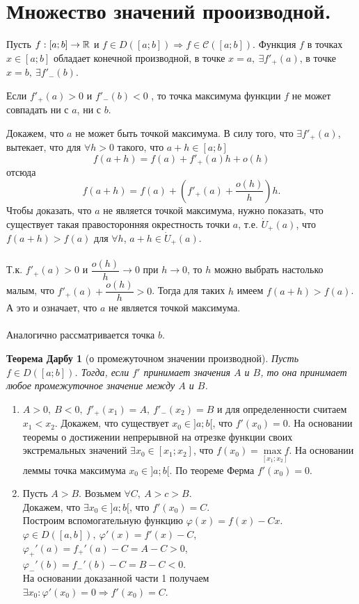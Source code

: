 \section{Множество значений прооизводной.}
Пусть $f:[a;b] \rightarrow \mathbb{R}$ и $f \in D([a;b]) \Rightarrow f \in \mathcal{C} ([a;b]) $. Функция $f$ в точках $x \in [a;b]$ обладает конечной производной, в точке $x=a, \ \exists f'_+ (a)$, в точке $x=b, \ \exists f'_- (b)$.
\begin{lemma}
	Если $f'_+ (a)>0$ и $f'_- (b)<0$ , то точка максимума функции $f$ не может совпадать ни с $a$, ни с $b$.
\end{lemma}
\begin{Proof}
	Докажем, что $a$ не может быть точкой максимума. В силу того, что $\exists f'_+ (a)$, вытекает, что для $\forall h>0$ такого, что $a+h \in [a;b]$
	$$f(a+h)=f(a)+f'_+ (a)h+o(h)$$
	отсюда $$f(a+h)=f(a)+(f'_+ (a)+\frac{o(h)}{h})h.$$
	Чтобы доказать, что $a$ не является точкой максимума, нужно показать, что существует такая правосторонняя окрестность точки $a$, т.е. $\dot U_+(a)$, что $f(a+h)>f(a)$ для $\forall h$, $a+h \in \dot U_+(a)$.\\\\
	Т.к. $f'_+ (a)>0$ и $\dfrac{o(h)}{h} \rightarrow 0$ при $h \rightarrow 0$, то $h$ можно выбрать настолько малым, что $f'_+ (a)+\dfrac{o(h)}{h} >0$. Тогда для таких $h$ имеем $f(a+h)>f(a)$. А это и означает, что $a$ не является точкой максимума.\\\\
	Аналогично рассматривается точка $b$.
\end{Proof}
\newtheorem*{thdarbu}{Теорема Дарбу}
\begin{thdarbu}[о промежуточном значении производной]
	Пусть $f \in D([a;b])$. Тогда, если $f'$ принимает значения $A$ и $B$, то она принимает любое промежуточное значение между $A$ и $B$.
\end{thdarbu}
\begin{Proof}
	\begin{enumerate}
		\item $A>0, \ B<0, \ f'_+ (x_1)=A, \ f'_- (x_2)=B$ и для определенности считаем $x_1<x_2$. Докажем, что существует $x_0 \in ]a;b[$, что $f'(x_0)=0$. На основании теоремы о достижении непрерывной на отрезке функции своих экстремальных значений $\exists x_0 \in [x_1;x_2]$, что $f(x_0) = \underset{[x_1;x_2]}{\max f}$. На основании леммы точка максимума $x_0 \in ]a;b[$. По теореме Ферма $f'(x_0)=0$.
		\item Пусть $A>B$. Возьмем $\forall C, \ A > c> B$.\\
		Докажем, что $\exists x_0 \in ]a;b[$, что $f'(x_0)=C$.\\
		Построим вспомогательную функцию $\varphi(x) = f(x) - Cx.$
		$\varphi \in D ([a, b]),\ \varphi '(x) = f'(x) - C$, \\
		$\varphi_+'(a)  = f_+'(a) - C = A - C  > 0$, \\
		$\varphi_-'(b)  = f_-'(b) - C = B - C  < 0$. \\
		На основании доказанной части 1 получаем
		$\exists x_0: \varphi' (x_0) = 0 \Rightarrow f'(x_0) = C.$
	\end{enumerate}
\end{Proof}\\\\
